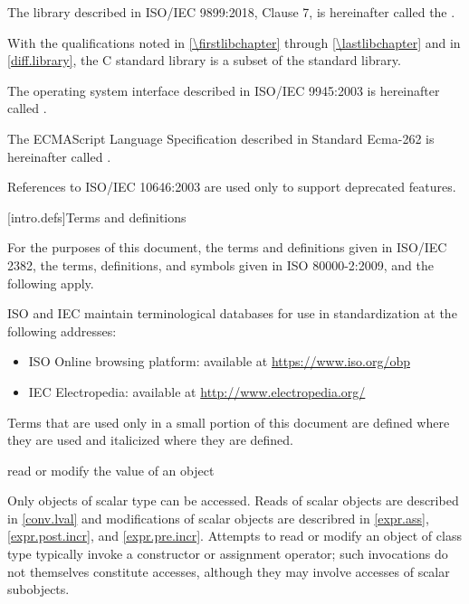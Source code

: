 \pnum
The library described in ISO/IEC 9899:2018, Clause 7,
is hereinafter called the
.
\begin{footnote}
With the qualifications noted in \ref{\firstlibchapter}
through \ref{\lastlibchapter} and in \ref{diff.library}, the C standard
library is a subset of the \Cpp{} standard library.
\end{footnote}

\pnum
The operating system interface described in ISO/IEC 9945:2003 is
hereinafter called .

\pnum
The ECMAScript Language Specification described in Standard Ecma-262 is
hereinafter called .

\pnum
\begin{note}
References to ISO/IEC 10646:2003 are used only
to support deprecated features.
\end{note}

[intro.defs]{Terms and definitions}

\pnum
{}%
For the purposes of this document,
the terms and definitions
given in ISO/IEC 2382,
the terms, definitions, and symbols
given in ISO 80000-2:2009,
and the following apply.

\pnum
ISO and IEC maintain terminological databases
for use in standardization
at the following addresses:
\begin{itemize}
\item ISO Online browsing platform: available at \url{https://www.iso.org/obp}
\item IEC Electropedia: available at \url{http://www.electropedia.org/}
\end{itemize}

\pnum
Terms that are used only in a small portion of this document
are defined where they are used and italicized where they are
defined.

%
read or modify the value of an object

\begin{defnote}
Only objects of scalar type can be accessed.
Reads of scalar objects are described in \ref{conv.lval} and
modifications of scalar objects are describred in
\ref{expr.ass}, \ref{expr.post.incr}, and \ref{expr.pre.incr}.
Attempts to read or modify an object of class type
typically invoke a constructor
or assignment operator;
such invocations do not themselves constitute accesses,
although they may involve accesses of scalar subobjects.
\end{defnote}

